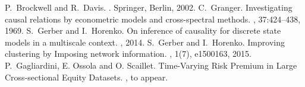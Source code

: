 \documentclass[a0,portrait]{a0poster}
\begin{document}
\begin{multicols}{2}
\par


\begin{thebibliography}{10}
P.~Brockwell and R.~Davis.
.
\newblock Springer, Berlin, 2002.
C.~Granger.
\newblock Investigating causal relations by econometric models and
  cross-spectral methods.
, 37:424--438, 1969.
S.~Gerber and I.~Horenko.
\newblock On inference of causality for discrete state models in a multiscale
  context.
, 2014.
S.~Gerber and I.~Horenko.
\newblock Improving clustering by Imposing network information.
, 1(7), e1500163, 2015.
P.~Gagliardini, E. Ossola and O. Scaillet.
\newblock Time-Varying Risk Premium in Large Cross-sectional Equity Datasets.
, to appear.
 

\end{thebibliography}

\end{multicols}
\end{document}
